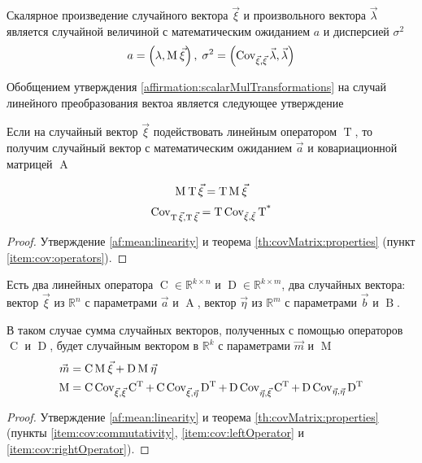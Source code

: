 \begin{affirmation}\label{affirmation:scalarMulTransformations}
  Скалярное произведение случайного вектора $\vec{\xi}$ и произвольного
  вектора $\vec{\lambda}$ является случайной величиной с математическим
  ожиданием $a$ и дисперсией $\sigma^2$
  $$a = \left( \lambda, \operatorname{M}_{} \vec{\xi} \right),\;
      \sigma^2
      = \left( \operatorname{Cov}^{}_{\vec{\xi}, \vec{\xi}} \vec{\lambda}, \vec{\lambda} \right)$$
\end{affirmation}

Обобщением утверждения \ref{affirmation:scalarMulTransformations} на случай
линейного преобразования вектоа является следующее утверждение
\begin{affirmation}\label{affirmation:vectorRotated}
  Если на случайный вектор $\vec{\xi}$ подействовать линейным оператором
  $\operatorname{T}$, то получим случайный вектор с математическим ожиданием
  $\vec{a}$ и ковариационной матрицей $\operatorname{A}$

  $$\operatorname{M}_{} \operatorname{T} \vec{\xi} = \operatorname{T} \operatorname{M}_{} \vec{\xi}$$
  $$\operatorname{Cov}^{}_{\operatorname{T} \vec{\xi}, \operatorname{T} \vec{\xi}}
      = \operatorname{T} \operatorname{\operatorname{Cov}^{}_{\vec{\xi}, \vec{\xi}}} \operatorname{T^*}$$
\end{affirmation}
\begin{proof}
  Утверждение \ref{af:mean:linearity} и теорема \ref{th:covMatrix:properties}
  (пункт \ref{item:cov:operators}).
\end{proof}

\begin{affirmation}\label{affirmation:randomVector:linearTransformations}
  Есть два линейных оператора $\operatorname{C} \in \mathbb{R}^{k \times n}$
  и $\operatorname{D} \in \mathbb{R}^{k \times m}$, два случайных вектора:
  вектор $\vec{\xi}$ из $\mathbb{R}^n$ с параметрами $\vec{a}$ и
  $\operatorname{A}$, вектор $\vec{\eta}$ из $\mathbb{R}^m$ с параметрами
  $\vec{b}$ и $\operatorname{B}$.

  В таком случае сумма случайных векторов, полученных с помощью операторов
  $\operatorname{C}$ и $\operatorname{D}$, будет случайным вектором
  в $\mathbb{R}^k$ с параметрами $\vec{m}$ и $\operatorname{M}$
  \begin{align*}
      \vec{m} &= \operatorname{C} \operatorname{M}_{} \vec{\xi}
      + \operatorname{D} \operatorname{M}_{} \vec{\eta} \\
      \operatorname{M} &= \operatorname{C} \operatorname{Cov}^{}_{\vec{\xi}, \vec{\xi}} \operatorname{C^T}
      + \operatorname{C} \operatorname{Cov}^{}_{\vec{\xi}, \vec{\eta}} \operatorname{D^T}
      + \operatorname{D} \operatorname{Cov}^{}_{\vec{\eta}, \vec{\xi}} \operatorname{C^T}
      + \operatorname{D} \operatorname{Cov}^{}_{\vec{\eta}, \vec{\eta}} \operatorname{D^T}
  \end{align*}
\end{affirmation}
\begin{proof}
  Утверждение \ref{af:mean:linearity} и теорема \ref{th:covMatrix:properties}
  (пункты \ref{item:cov:commutativity}, \ref{item:cov:leftOperator} и
  \ref{item:cov:rightOperator}).
\end{proof}
